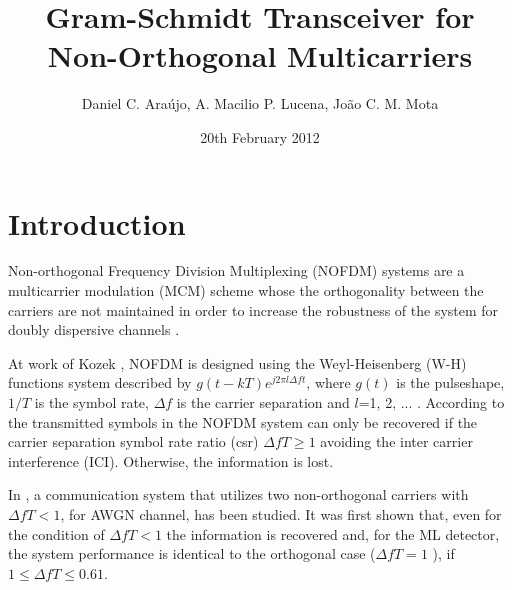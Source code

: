 \documentclass[twocolumn]{el-author}
\date{20th February 2012}
\begin{document}
\title{Gram-Schmidt Transceiver for Non-Orthogonal Multicarriers}

\author{Daniel C. Ara\'ujo, A. Macilio P. Lucena, Jo\~ao C. M. Mota}



\maketitle

\section{Introduction}Non-orthogonal Frequency Division Multiplexing (NOFDM) systems are  a multicarrier modulation (MCM) scheme whose the orthogonality between the carriers are not maintained in order to increase the robustness of the system for doubly dispersive channels \cite{Kozek,Fang}. 

At work of Kozek \cite{Kozek}, NOFDM is designed using the Weyl-Heisenberg (W-H) functions system described by $g(t-kT)e^{j2\pi l\Delta ft}$, where $g(t)$ is the pulseshape, $1/T$ is the symbol rate, $\Delta f$ is the carrier separation and $l$=1, 2, ... . According to \cite{Kozek} the transmitted symbols in the NOFDM system can only be recovered if the carrier separation symbol rate ratio (csr) $\Delta fT\geq1$ avoiding the inter carrier interference (ICI). Otherwise, the information is lost.  

In \cite{Lucena}, a communication system that utilizes two non-orthogonal carriers with $\Delta fT < 1$, for AWGN channel, has been studied. It was first shown that, even for the condition of $\Delta fT<1$ the information is recovered and, for the ML detector, the system performance is identical to the orthogonal  case ($\Delta fT=1$ ), if $1\leq \Delta fT \leq 0.61$.
\end{document}
